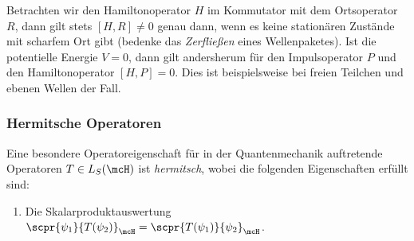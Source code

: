 \documentclass{subfiles}
\begin{document}
            Betrachten wir den Hamiltonoperator $H$ im Kommutator mit dem Ortsoperator $R$, dann gilt stets $[H,R]\neq 0$ genau dann, wenn es keine stationären Zustände mit scharfem Ort gibt (bedenke das \emph{Zerfließen} eines Wellenpaketes). Ist die potentielle Energie $V=0$, dann gilt andersherum für den Impulsoperator $P$ und den Hamiltonoperator $[H,P] = 0$. Dies ist beispielsweise bei freien Teilchen und ebenen Wellen der Fall. 

        \subsubsection*{Hermitsche Operatoren}
            Eine besondere Operatoreigenschaft für in der Quantenmechanik auftretende Operatoren $T\in L_S(\mcH)$ ist \emph{hermitsch}, wobei die folgenden Eigenschaften erfüllt sind:
            \begin{enumerate}[label=(\roman*)]
                \item Die Skalarproduktauswertung $\scpr{\psi_1}{T(\psi_2)}_{\mcH} = \scpr{T(\psi_1)}{\psi_2}_{\mcH}$.
            \end{enumerate}
\end{document}

